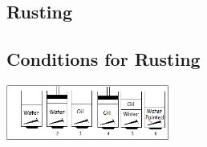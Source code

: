 \begin{multicols}{2}
%
%


\section*{Rusting}

 
\subsection{Conditions for Rusting}

\begin{center}
\includegraphics[width=0.4\textwidth]{./img/rusting-nails-6.png}
\end{center}


\end{multicols}
